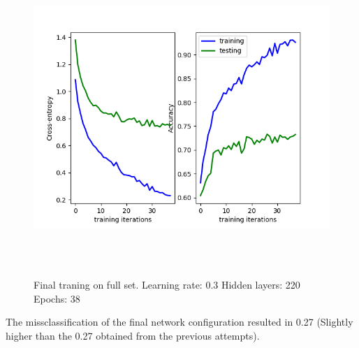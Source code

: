 \documentclass[a4paper]{article}
\begin{document}
\begin{figure}[h]
\caption{Final traning on full set. Learning rate: 0.3 Hidden layers: 220 Epochs: 38}
\centering
\includegraphics[width=15cm, height=12cm]{final}
\end{figure}

The missclassification of the final network configuration resulted in 0.27 (Slightly higher than the 0.27 obtained from the previous attempts). 
\end{document}
